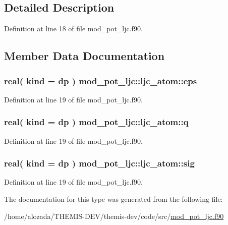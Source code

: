 \subsection{Detailed Description}


Definition at line 18 of file mod\+\_\+pot\+\_\+ljc.\+f90.



\subsection{Member Data Documentation}
\subsubsection[{\texorpdfstring{eps}{eps}}]{\setlength{\rightskip}{0pt plus 5cm}real( kind = dp ) mod\+\_\+pot\+\_\+ljc\+::ljc\+\_\+atom\+::eps}\hypertarget{structmod__pot__ljc_1_1ljc__atom_a9c100db84a17fb8ba3e048b0f7c5fcce}{}\label{structmod__pot__ljc_1_1ljc__atom_a9c100db84a17fb8ba3e048b0f7c5fcce}


Definition at line 19 of file mod\+\_\+pot\+\_\+ljc.\+f90.

\subsubsection[{\texorpdfstring{q}{q}}]{\setlength{\rightskip}{0pt plus 5cm}real( kind = dp ) mod\+\_\+pot\+\_\+ljc\+::ljc\+\_\+atom\+::q}\hypertarget{structmod__pot__ljc_1_1ljc__atom_a94e32d61122a45a46b7f0d82c0e13c40}{}\label{structmod__pot__ljc_1_1ljc__atom_a94e32d61122a45a46b7f0d82c0e13c40}


Definition at line 19 of file mod\+\_\+pot\+\_\+ljc.\+f90.

\subsubsection[{\texorpdfstring{sig}{sig}}]{\setlength{\rightskip}{0pt plus 5cm}real( kind = dp ) mod\+\_\+pot\+\_\+ljc\+::ljc\+\_\+atom\+::sig}\hypertarget{structmod__pot__ljc_1_1ljc__atom_a2213de956be81f40a4c158a873058040}{}\label{structmod__pot__ljc_1_1ljc__atom_a2213de956be81f40a4c158a873058040}


Definition at line 19 of file mod\+\_\+pot\+\_\+ljc.\+f90.



The documentation for this type was generated from the following file\+:\begin{DoxyCompactItemize}
\item 
/home/alozada/\+T\+H\+E\+M\+I\+S-\/\+D\+E\+V/themis-\/dev/code/src/\hyperlink{mod__pot__ljc_8f90}{mod\+\_\+pot\+\_\+ljc.\+f90}\end{DoxyCompactItemize}
